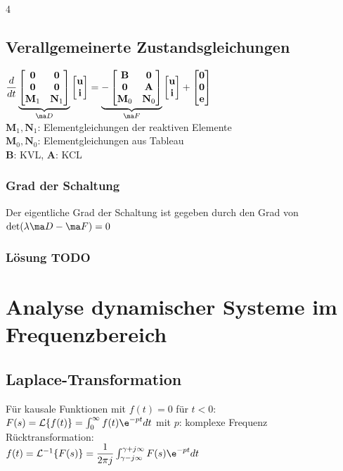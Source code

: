 \documentclass[fs, footer]{latex4ei}
\begin{document}
\begin{multicols*}{4}
        \subsection{Verallgemeinerte Zustandsgleichungen}
    $\frac{d}{dt} \underbrace{\begin{bmatrix}\mathbf{0} & \mathbf{0}\\\mathbf{0} & \mathbf{0}\\\mathbf{M}_1 & \mathbf{N}_1\end{bmatrix}}_{\ma D}\begin{bmatrix}\mathbf{u}\\\mathbf{i}\end{bmatrix} = \underbrace{ - \begin{bmatrix} \mathbf{B} & \mathbf{0} \\ \mathbf{0} & \mathbf{A} \\ \mathbf{M}_0 & \mathbf{N}_0\end{bmatrix}}_{\ma F}\begin{bmatrix}\mathbf{u}\\\mathbf{i}\end{bmatrix} + \begin{bmatrix}\mathbf{0}\\\mathbf{0}\\\mathbf{e}\end{bmatrix}$\\
    $\mathbf{M}_1, \mathbf{N}_1$: Elementgleichungen der reaktiven Elemente\\
    $\mathbf{M}_0, \mathbf{N}_0$: Elementgleichungen aus Tableau\\
    $\mathbf{B}$: KVL, $\mathbf{A}$: KCL

        \subsubsection{Grad der Schaltung}
        Der eigentliche Grad der Schaltung ist gegeben durch den Grad von $\det (\lambda \ma D- \ma F)=0$
        \subsubsection{Lösung TODO}

        \section{Analyse dynamischer Systeme im Frequenzbereich}
        \subsection{Laplace-Transformation}
        Für kausale Funktionen mit $f(t) = 0$ für $t < 0$:\\
    $F(s) = \mathcal L\{f(t)\} = \int_0^\infty f(t) \e^{-pt}dt$ mit $p$: komplexe Frequenz\\
        Rücktransformation: \\
    $f(t) = \mathcal L^{-1}\{F(s)\} = \fr{1}{2\pi j}\int_{\gamma-j\infty}^{\gamma+j\infty} F(s) \e^{-pt}dt$\\

\end{multicols*}
\end{document}
